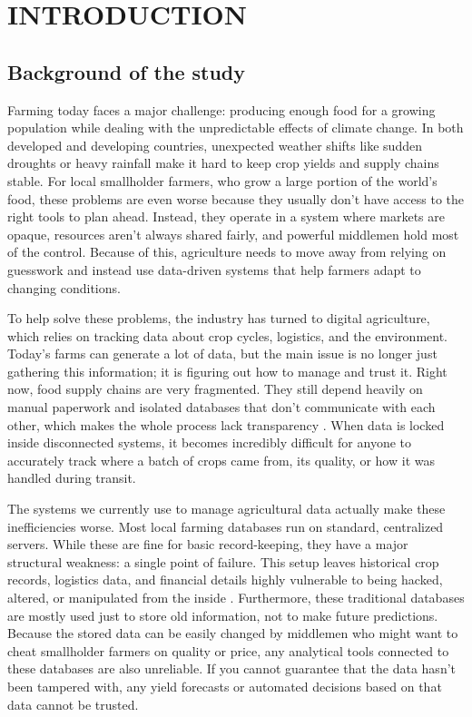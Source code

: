 \chapter{INTRODUCTION}

\section{Background of the study}

Farming today faces a major challenge: producing enough food for a growing population while dealing with the unpredictable effects of climate change. In both developed and developing countries, unexpected weather shifts like sudden droughts or heavy rainfall make it hard to keep crop yields and supply chains stable. For local smallholder farmers, who grow a large portion of the world's food, these problems are even worse because they usually don't have access to the right tools to plan ahead. Instead, they operate in a system where markets are opaque, resources aren't always shared fairly, and powerful middlemen hold most of the control. Because of this, agriculture needs to move away from relying on guesswork and instead use data-driven systems that help farmers adapt to changing conditions.

To help solve these problems, the industry has turned to digital agriculture, which relies on tracking data about crop cycles, logistics, and the environment. Today's farms can generate a lot of data, but the main issue is no longer just gathering this information; it is figuring out how to manage and trust it. Right now, food supply chains are very fragmented. They still depend heavily on manual paperwork and isolated databases that don't communicate with each other, which makes the whole process lack transparency \parencite{sharma2023blockchain}. When data is locked inside disconnected systems, it becomes incredibly difficult for anyone to accurately track where a batch of crops came from, its quality, or how it was handled during transit.

The systems we currently use to manage agricultural data actually make these inefficiencies worse. Most local farming databases run on standard, centralized servers. While these are fine for basic record-keeping, they have a major structural weakness: a single point of failure. This setup leaves historical crop records, logistics data, and financial details highly vulnerable to being hacked, altered, or manipulated from the inside \parencite{alabsi2023blockchain}. Furthermore, these traditional databases are mostly used just to store old information, not to make future predictions. Because the stored data can be easily changed by middlemen who might want to cheat smallholder farmers on quality or price, any analytical tools connected to these databases are also unreliable. If you cannot guarantee that the data hasn't been tampered with, any yield forecasts or automated decisions based on that data cannot be trusted.

